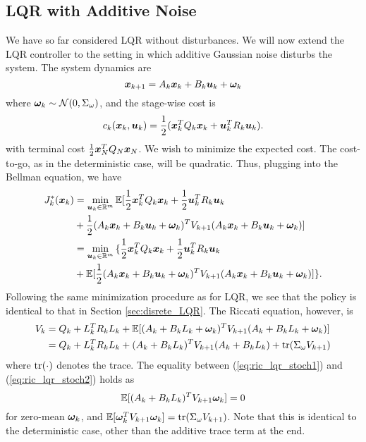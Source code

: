 \subsection{LQR with Additive Noise}

We have so far considered LQR without disturbances. We will now extend the LQR controller to the setting in which additive Gaussian noise disturbs the system.
The system dynamics are
\begin{equation}
    \bm{x}_{k+1} = A_k \bm{x}_k + B_k \bm{u}_k + \bm{\omega}_{k}
\end{equation}
where $\bm{\omega}_{k} \sim \mathcal{N}(0, \Sigma_{\omega})$, and the stage-wise cost is 
\begin{equation}
    c_k(\bm{x}_k,\bm{u}_k) = \frac{1}{2} ( \bm{x}_k^T Q_k \bm{x}_k + \bm{u}_k^T R_k \bm{u}_k).
\end{equation}
with terminal cost $\frac{1}{2}\bm{x}_N^T Q_N \bm{x}_N$. We wish to minimize the expected cost. The cost-to-go, as in the deterministic case, will be quadratic. Thus, plugging into the Bellman equation, we have 
\begin{align}
\label{eq:LQR_rec_cost_stoch}
    J_{k}^*(\bm{x}_{k}) &=  \min_{\bm{u}_{k} \in \mathbb{R}^m} \mathbb{E} {\Large[} 
    \frac{1}{2} \bm{x}_{k}^T Q_{k} \bm{x}_{k} + \frac{1}{2} \bm{u}_{k}^T R_{k} \bm{u}_{k}\\
    &+ \frac{1}{2} (A_{k} \bm{x}_{k} + B_{k} \bm{u}_{k} + \bm{\omega}_{k})^T V_{k+1} (A_{k} \bm{x}_{k} + B_{k} \bm{u}_{k} + \bm{\omega}_{k}) \nonumber {\Large]} \nonumber\\
    &= \min_{\bm{u}_{k} \in \mathbb{R}^m} {\Large\{} 
    \frac{1}{2} \bm{x}_{k}^T Q_{k} \bm{x}_{k} + \frac{1}{2} \bm{u}_{k}^T R_{k} \bm{u}_{k} \\
    &+ \mathbb{E} {\Large[} \frac{1}{2} (A_{k} \bm{x}_{k} + B_{k} \bm{u}_{k} + \bm{\omega}_{k})^T V_{k+1} (A_{k} \bm{x}_{k} + B_{k} \bm{u}_{k} + \bm{\omega}_{k}) \nonumber {\Large]} {\Large\}}. \nonumber
\end{align}
Following the same minimization procedure as for LQR, we see that the policy is identical to that in Section \ref{sec:disrete_LQR}. The Riccati equation, however, is
\begin{align}
    V_k &= Q_k + L_k^T R_k L_k + \mathbb{E}[(A_{k}+ B_{k} L_k + \bm{\omega}_{k})^T V_{k+1} (A_{k} + B_{k} L_k + \bm{\omega}_{k})] \label{eq:ric_lqr_stoch1}\\
    &= Q_{k}  + L_{k}^T R_{k} L_{k} + (A_{k} + B_{k} L_{k})^T V_{k+1}   (A_{k} + B_{k} L_{k}) + \text{tr}(\Sigma_{\omega} V_{k+1}) \label{eq:ric_lqr_stoch2}
\end{align}
where $\text{tr}(\cdot)$ denotes the trace. The equality between (\ref{eq:ric_lqr_stoch1}) and (\ref{eq:ric_lqr_stoch2}) holds as 
\begin{equation}
    \mathbb{E}[(A_{k} + B_{k} L_{k})^T V_{k+1} \bm{\omega}_{k}] = 0
\end{equation} 
for zero-mean $\bm{\omega}_{k}$, and $\mathbb{E}[\bm{\omega}_{k}^T V_{k+1} \bm{\omega}_{k}] = \text{tr}(\Sigma_{\omega} V_{k+1})$. Note that this is identical to the deterministic case, other than the additive trace term at the end. 


